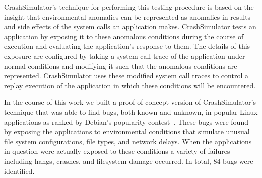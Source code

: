 % 

CrashSimulator's technique for performing this testing procedure is based
on the insight that environmental anomalies can be represented as anomalies
in results and side effects of the system calls an application makes.
CrashSimulator tests an application by exposing it to these anomalous
conditions during the course of execution and evaluating the application's
response to them.  The details of this exposure are configured by taking a
system call trace of the application under normal conditions and modifying
it such that the anomalous conditions are represented.  CrashSimulator uses
these modified system call traces to control a replay execution of the
application in which these conditions will be encountered.

In the course of this work we built a proof of concept version of
CrashSimulator's technique that was able to find bugs, both known and
unknown, in popular Linux applications as ranked by Debian's popularity
contest~\cite{DebPopCon}.  These bugs were found by exposing the
applications to environmental conditions that simulate unusual file system
configurations, file types, and network delays.  When the applications in
question were actually exposed to these conditions a variety of failures
including hangs, crashes, and filesystem damage occurred.  In total, 84
bugs were identified.

